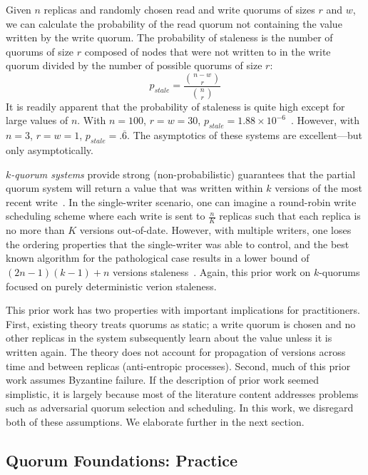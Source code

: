 \documentclass{vldb}
\begin{document}
Given $n$ replicas and randomly chosen read and write quorums of sizes
$r$ and $w$, we can calculate the probability of the read quorum not
containing the value written by the write quorum.  The probability of
staleness is the number of quorums of size $r$ composed of nodes that
were not written to in the write quorum divided by the number of
possible quorums of size $r$:
\begin{equation}
\label{eq:prob-strict}
p_{stale}=\frac{{n-w \choose r}}{{n \choose r}}
\end{equation}
It is readily apparent that the probability of staleness is quite high
except for large values of $n$.  With $n=100$, $r=w=30$, $p_{stale} =
1.88 \times 10^{-6}$~\cite{nonstrict-availability}.  However, with
$n=3$, $r=w=1$, $p_{stale} = .\overline{6}$.  The asymptotics of these
systems are excellent---but only asymptotically.  

\textit{$k$-quorum systems} provide strong (non-probabilistic)
guarantees that the partial quorum system will return a value that was
written within $k$ versions of the most recent
write~\cite{nonstrict-availability}.  In the single-writer scenario,
one can imagine a round-robin write scheduling scheme where each write
is sent to $\frac{n}{K}$ replicas such that each replica is no more
than $K$ versions out-of-date.  However, with multiple writers, one
loses the ordering properties that the single-writer was able to
control, and the best known algorithm for the pathological case
results in a lower bound of $(2n-1)(k-1)+n$ versions staleness~\cite{k-quorum-lb}.
Again, this prior work on $k$-quorums focused on purely deterministic
verion staleness.

This prior work has two properties with important implications for
practitioners.  First, existing theory treats quorums as static; a
write quorum is chosen and no other replicas in the system
subsequently learn about the value unless it is written again.  The
theory does not account for propagation of versions across time and
between replicas (anti-entropic processes).  Second, much of this
prior work assumes Byzantine failure.  If the description of prior
work seemed simplistic, it is largely because most of the literature
content addresses problems such as adversarial quorum selection and
scheduling.  In this work, we disregard both of these assumptions.  We
elaborate further in the next section.

\subsection{Quorum Foundations: Practice}
\label{sec:practice}
\end{document}
